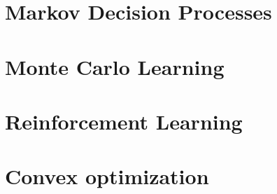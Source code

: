 \documentclass[11pt,a4paper]{article}
\begin{document}
\section{Markov Decision Processes}

\newpage

\section{Monte Carlo Learning}

\newpage

\section{Reinforcement Learning}

\newpage

\appendix
\section{Convex optimization}

\end{document}
